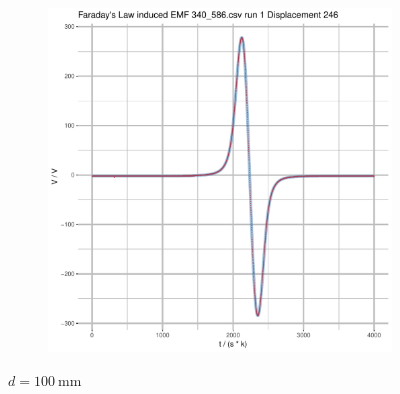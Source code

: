\documentclass[a4paper,11pt]{article}
\begin{document}
\begin{figure}[b]
\begin{subfigure}{.5\textwidth}
\end{subfigure}
\begin{subfigure}{.7\textwidth}
    \centering
    \includegraphics[width=\textwidth,page=6]{Rplots.pdf}
\end{subfigure}
\caption{\(d = \SI{100}{\milli\metre}\)}
\end{figure}
\end{document}
